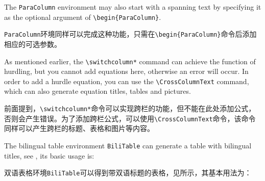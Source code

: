 \begin{ParaColumn}
    \CrossColumnText{
        
    }
    
    \switchcolumn*

    The \verb"ParaColumn" environment may also start with a spanning text by specifying it as the optional argument of \verb"\begin{ParaColumn}".

    \switchcolumn

    \verb"ParaColumn"环境同样可以完成这种功能，只需在\verb"\begin{ParaColumn}"命令后添加相应的可选参数。

    \CrossColumnText{
        
    }


    As mentioned earlier, the \verb"\switchcolumn*" command can achieve the function of hurdling, but you cannot add equations here, otherwise an error will occur.  In order to add a hurdle equation, you can use the \verb"\CrossColumnText" command, which can also generate equation titles, tables and pictures.

    \switchcolumn

    前面提到，\verb"\switchcolumn*"命令可以实现跨栏的功能，但不能在此处添加公式，否则会产生错误。为了添加跨栏公式，可以使用\verb"\CrossColumnText"命令，该命令同样可以产生跨栏的标题、表格和图片等内容。

    \CrossColumnText{
        
    }


    The bilingual table environment \verb"BiliTable" can generate a table with bilingual titles, see , its basic usage is:
    
    \switchcolumn

    双语表格环境\verb"BiliTable"可以得到带双语标题的表格，见所示，其基本用法为：

    \CrossColumnText{
        
        
    }
    \switchcolumn*


\end{ParaColumn}

